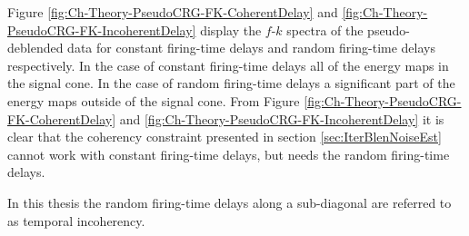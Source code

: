 Figure \ref{fig:Ch-Theory-PseudoCRG-FK-CoherentDelay} and \ref{fig:Ch-Theory-PseudoCRG-FK-IncoherentDelay} display the $f$-$k$ spectra of the pseudo-deblended data for constant firing-time delays and random firing-time delays respectively. In the case of constant firing-time delays all of the energy maps in the signal cone. In the case of random firing-time delays a significant part of the energy maps outside of the signal cone. From Figure \ref{fig:Ch-Theory-PseudoCRG-FK-CoherentDelay} and \ref{fig:Ch-Theory-PseudoCRG-FK-IncoherentDelay} it is clear that the coherency constraint presented in section \ref{sec:IterBlenNoiseEst} cannot work with constant firing-time delays, but needs the random firing-time delays. 

In this thesis the random firing-time delays along a sub-diagonal are referred to as temporal incoherency.  

